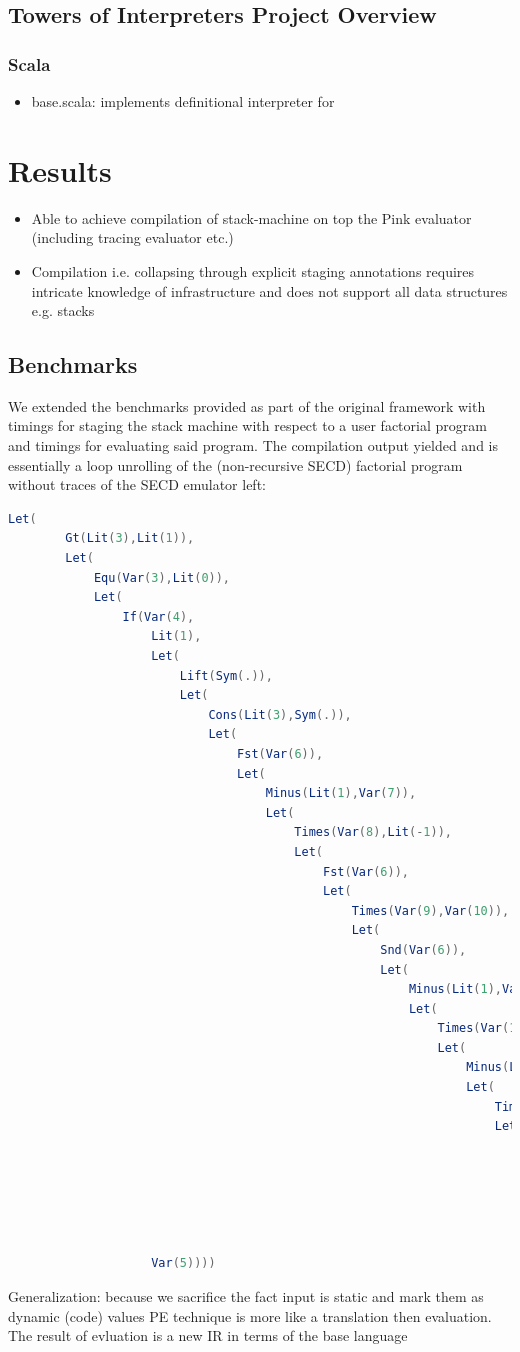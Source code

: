 \documentclass{article}
\theoremstyle{definition}
\begin{document}
\subsection{Towers of Interpreters Project Overview}
\subsubsection{Scala}
\begin{itemize}
	\item base.scala: implements definitional interpreter for \mslang
\end{itemize}

\section{Results}
\begin{itemize}
	\item Able to achieve compilation of stack-machine on top the Pink evaluator (including tracing evaluator etc.)
	\item Compilation i.e. collapsing through explicit staging annotations requires intricate knowledge of infrastructure and does not support all data structures e.g. stacks
\end{itemize}

\subsection{Benchmarks}
We extended the benchmarks provided as part of the original framework \cite{amin2017collapsing} with timings for staging the stack machine with respect to a user factorial program and timings for evaluating said program.
The compilation output yielded and is essentially a loop unrolling of the (non-recursive SECD) factorial program without traces of the SECD emulator left:
\begin{lstlisting}[language=Scala]
	Let(
		Gt(Lit(3),Lit(1)),
		Let(
			Equ(Var(3),Lit(0)),
			Let(
				If(Var(4),
					Lit(1),
					Let(
						Lift(Sym(.)),
						Let(
							Cons(Lit(3),Sym(.)),
							Let(
								Fst(Var(6)),
								Let(
									Minus(Lit(1),Var(7)),
									Let(
										Times(Var(8),Lit(-1)),
										Let(
											Fst(Var(6)),
											Let(
												Times(Var(9),Var(10)),
												Let(
													Snd(Var(6)),
													Let(
														Minus(Lit(1),Var(7)),
														Let(
															Times(Var(13),Lit(-1)),
															Let(
																Minus(Lit(1),Var(14)),
																Let(
																	Times(Var(15),Lit(-1)),
																	Let(
																		Times(Var(16),Var(11)),
																		Let(
																			Minus(Lit(1),Var(14)),
																			Let(
																				Times(Var(18),Lit(-1)),
																				Var(17))))))))))))))))),
					Var(5))))
\end{lstlisting}
Generalization: because we sacrifice the fact input is static and mark them as dynamic (code) values
PE technique is more like a translation then evaluation. The result of evluation is a new IR in terms of the base language
\end{document}
